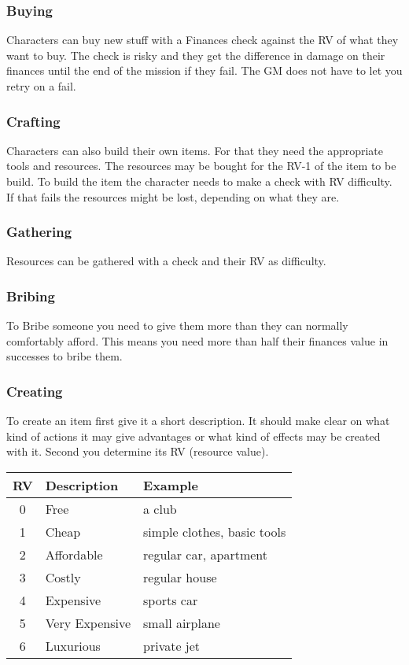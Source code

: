 \documentclass[11pt]{article}
\begin{document}
{\begin{multicols}{2}[]
\subsubsection{Buying}
\label{sec:org389904c}
Characters can buy new stuff with a Finances check against the RV of what they want to buy. The check is risky and they get the difference in damage on their finances until the end of the mission if they fail. The GM does not have to let you retry on a fail.

\subsubsection{Crafting}
\label{sec:org026b5dd}
Characters can also build their own items. For that they need the appropriate tools and resources. The resources may be bought for the RV-1 of the item to be build. To build the item the character needs to make a check with RV difficulty. If that fails the resources might be lost, depending on what they are.

\subsubsection{Gathering}
\label{sec:orgb5b4bcb}
Resources can be gathered with a check and their RV as difficulty.

\subsubsection{Bribing}
\label{sec:org93dbacc}
To Bribe someone you need to give them more than they can normally comfortably afford. This means you need more than half their finances value in successes to bribe them.

\subsubsection{Creating}
\label{sec:org3b2c7c8}
To create an item first give it a short description. It should make clear on what kind of actions it may give advantages or what kind of effects may be created with it. Second you determine its RV (resource value).

\begin{center}
\begin{tabular}{c|l|l}
\textbf{RV} & \textbf{Description} & \textbf{Example}\\
\hline
0 & Free & a club\\
1 & Cheap & simple clothes, basic tools\\
2 & Affordable & regular car, apartment\\
3 & Costly & regular house\\
4 & Expensive & sports car\\
5 & Very Expensive & small airplane\\
6 & Luxurious & private jet\\
\end{tabular}
\end{center}



\end{multicols}}
\end{document}
